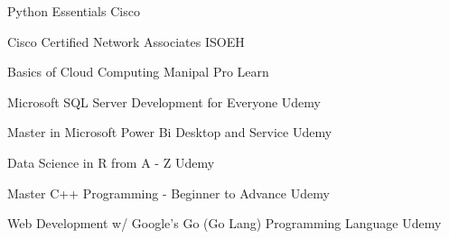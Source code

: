 
\begin{cventries}


 \cvsimpentry
    {Python Essentials}
    {Cisco}

 \cvsimpentry
    {Cisco Certified Network Associates}
    {ISOEH}

 \cvsimpentry
    {Basics of Cloud Computing}
    {Manipal Pro Learn}

 \cvsimpentry
    {Microsoft SQL Server Development for Everyone}
    {Udemy}

 \cvsimpentry
    {Master in Microsoft Power Bi Desktop and Service}
    {Udemy}

 \cvsimpentry
    {Data Science in R from A - Z}
    {Udemy}

 \cvsimpentry
    {Master C++ Programming - Beginner to Advance}
    {Udemy}

 \cvsimpentry
    {Web Development w/ Google's Go (Go Lang) Programming Language}
    {Udemy}

\end{cventries}
